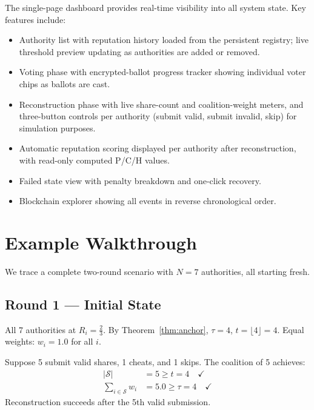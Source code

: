 \documentclass[12pt,a4paper]{article}
\theoremstyle{definition}
\theoremstyle{remark}
\begin{document}
The single-page dashboard provides real-time visibility into all system
state. Key features include:
\begin{itemize}
  \item Authority list with reputation history loaded from the persistent
    registry; live threshold preview updating as authorities are added or removed.
  \item Voting phase with encrypted-ballot progress tracker showing
    individual voter chips as ballots are cast.
  \item Reconstruction phase with live share-count and coalition-weight
    meters, and three-button controls per authority (submit valid, submit
    invalid, skip) for simulation purposes.
  \item Automatic reputation scoring displayed per authority after
    reconstruction, with read-only computed P/C/H values.
  \item Failed state view with penalty breakdown and one-click recovery.
  \item Blockchain explorer showing all events in reverse chronological order.
\end{itemize}

\section{Example Walkthrough}
\label{sec:walkthrough}

We trace a complete two-round scenario with $N = 7$ authorities, all
starting fresh.

\subsection{Round 1 — Initial State}

All 7 authorities at $R_i = \tfrac{2}{3}$. By Theorem~\ref{thm:anchor},
$\tau = 4$, $t = \lfloor 4 \rfloor = 4$.
Equal weights: $w_i = 1.0$ for all $i$.

Suppose 5 submit valid shares, 1 cheats, and 1 skips.
The coalition of 5 achieves:
\begin{align*}
  |\mathcal{S}| &= 5 \geq t = 4 \quad \checkmark \\
  \textstyle\sum_{i \in \mathcal{S}} w_i &= 5.0 \geq \tau = 4 \quad \checkmark
\end{align*}
Reconstruction succeeds after the 5th valid submission.
\end{document}
